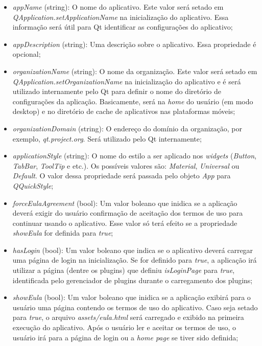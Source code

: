 \begin{itemize}
	\item \textit{appName} (string): O nome do aplicativo. Este valor será setado em \textit{QApplication.setApplicationName} na inicialização do aplicativo. Essa informação será útil para Qt identificar as configurações do aplicativo;

	\item \textit{appDescription} (string): Uma descrição sobre o aplicativo. Essa propriedade é opcional;

	\item \textit{organizationName} (string): O nome da organização. Este valor será setado em \textit{QApplication.setOrganizationName} na inicialização do aplicativo e é será utilizado internamente pelo Qt para definir o nome do diretório de configurações da aplicação. Basicamente, será na \textit{home} do usuário (em modo desktop) e no diretório de cache de aplicativos nas plataformas móveis;

	\item \textit{organizationDomain} (string): O endereço do domínio da organização, por exemplo, \textit{qt.project.org}. Será utilizado pelo Qt internamente;

	\item \textit{applicationStyle} (string): O nome do estilo a ser aplicado nos \textit{widgets} (\textit{Button}, \textit{TabBar}, \textit{ToolTip} e etc.). Os possíveis valores são: \textit{Material}, \textit{Universal} ou \textit{Default}. O valor dessa propriedade será passada pelo objeto \textit{App} para \textit{QQuickStyle};

	\item \textit{forceEulaAgreement} (bool): Um valor boleano que inidica se a aplicação deverá exigir do usuário confirmação de aceitação dos termos de uso para continuar usando o aplicativo. Esse valor só terá efeito se a propriedade \textit{showEula} for definida para \textit{true};

	\item \textit{hasLogin} (bool): Um valor boleano que indica se o aplicativo deverá carregar uma página de login na inicialização. Se for definido para \textit{true}, a aplicação irá utilizar a página (dentre os plugins) que definiu \textit{isLoginPage} para \textit{true}, identificada pelo gerenciador de plugins durante o carregamento dos plugins;

	\item \textit{showEula} (bool): Um valor boleano que inidica se a aplicação exibirá para o usuário uma página contendo os termos de uso do aplicativo. Caso seja setado para \textit{true}, o arquivo \textit{assets/eula.html} será carregado e exibido na primeira execução do aplicativo. Após o usuário ler e aceitar os termos de uso, o usuário irá para a página de login ou a \textit{home page} se tiver sido definida;


\end{itemize}
